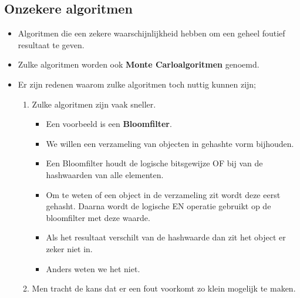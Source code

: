 \subsection{Onzekere algoritmen}
\begin{itemize}
    \item Algoritmen die een zekere waarschijnlijkheid hebben om een geheel foutief resultaat te geven.
    \item Zulke algoritmen worden ook \textbf{Monte Carloalgoritmen} genoemd.
    \item Er zijn redenen waarom zulke algoritmen toch nuttig kunnen zijn;
    \begin{enumerate}
        \item Zulke algoritmen zijn vaak sneller.
        \begin{itemize}
            \item Een voorbeeld is een \textbf{Bloomfilter}.
            \item We willen een verzameling van objecten in gehashte vorm bijhouden.
            \item Een Bloomfilter houdt de logische bitsgewijze OF bij van de hashwaarden van alle elementen.
            \item Om te weten of een object in de verzameling zit wordt deze eerst gehasht. Daarna wordt de logische EN operatie gebruikt op de bloomfilter met deze waarde.
            \item Als het resultaat verschilt van de hashwaarde dan zit het object er zeker niet in.
            \item Anders weten we het niet.
        \end{itemize}
        \item Men tracht de kans dat er een fout voorkomt zo klein mogelijk te maken.
    \end{enumerate}
\end{itemize}


